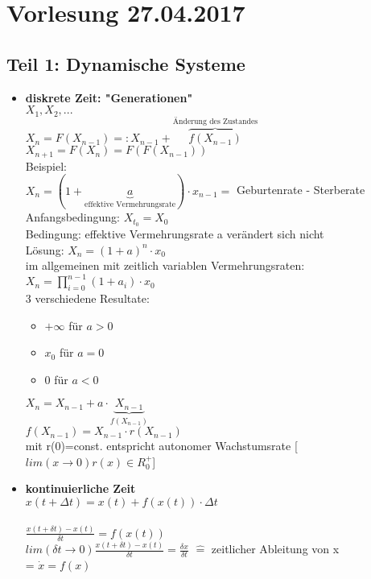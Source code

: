 \section{Vorlesung 27.04.2017}

\subsection{Teil 1: Dynamische Systeme}

\begin{itemize}
	\item \textbf{diskrete Zeit: "Generationen"}\\
	$X_1, X_2, ...$\\
	$X_n=F(X_{n-1})=:X_{n-1} + \overbrace{f(X_{n-1})}^{\text{Änderung des Zustandes}}$\\
	$X_{n+1}=F(X_n)=F(F(X_{n-1}))$\\
	Beispiel:\\
	$X_n=(1+\underbrace{a}_{\text{effektive Vermehrungsrate}}) \cdot x_{n-1}=$ Geburtenrate - Sterberate\\
	Anfangsbedingung: $X_{t_0}=X_0$\\
	Bedingung: effektive Vermehrungsrate a verändert sich nicht\\
	Lösung: $X_n=(1+a)^n \cdot x_0$\\
	im allgemeinen mit zeitlich variablen Vermehrungsraten: $X_n=\prod \limits_{i=0}^{n-1} (1+a_i) \cdot x_0$\\
	3 verschiedene Resultate:
	\begin{itemize}
		\item $+\infty$ für $a > 0$
		\item $x_0$ für $a=0$
		\item 0 für $a<0$
	\end{itemize}
	$X_n=X_{n-1} + a \cdot \underbrace{X_{n-1}}_{f(X_{n-1})}$\\
	$f(X_{n-1})=X_{n-1} \cdot r(X_{n-1})$\\
	mit r(0)=const. entspricht autonomer Wachstumsrate [$ lim (x \rightarrow 0) r(x) \in R_0^+$]
	\item \textbf{kontinuierliche Zeit}\\
	$x(t+\Delta t)=x(t) + f(x(t)) \cdot \Delta t$\\\\
	$\displaystyle \frac{x(t+ \delta t) - x(t)}{\delta t} = f(x(t))$\\
	$lim (\delta t \rightarrow 0) \displaystyle \frac{x(t+ \delta t) - x(t)}{\delta t} = \frac{\delta x}{\delta t}$ $\widehat{=}$ zeitlicher Ableitung von x\\
	= $\dot{x}=f(x)$
\end{itemize}

